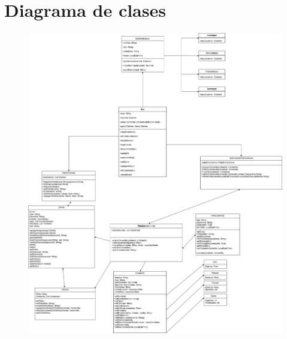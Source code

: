 \section{Diagrama de clases}\label{sec:diagrama-de-clases}
\begin{figure}[h]
    \centering
    \includegraphics[width=1\textwidth]{img/diagrama_clases}
\end{figure}
